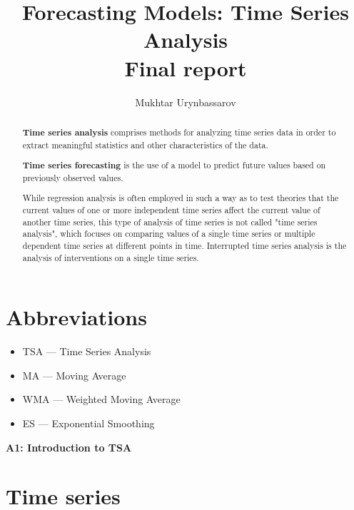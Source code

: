\documentclass[12pt, english]{article}
\title{Forecasting Models: Time Series Analysis\\
	   Final report}
\author{Mukhtar Urynbassarov}
\numberwithin{equation}{section} %
\theoremstyle{plain}
\theoremstyle{definition}
\begin{document}
\maketitle

\begin{abstract}
	\textbf{Time series analysis} comprises methods for analyzing time series data in order to extract meaningful statistics and other characteristics of the data.
	
	\textbf{Time series forecasting} is the use of a model to predict future values based on previously observed values.
	
	While regression analysis is often employed in such a way as to test theories that the current values of one or more independent time series affect the current value of another time series, this type of analysis of time series is not called "time series analysis", which focuses on comparing values of a single time series or multiple dependent time series at different points in time. Interrupted time series analysis is the analysis of interventions on a single time series.
\end{abstract}

\section*{Abbreviations}
\begin{itemize}
	\item TSA --- Time Series Analysis
	\item MA --- Moving Average
	\item WMA --- Weighted Moving Average
	\item ES --- Exponential Smoothing
\end{itemize}

\newpage
\begin{center}
	\huge{\textbf{A1: Introduction to TSA}}
\end{center}

\section{Time series}
\end{document}
